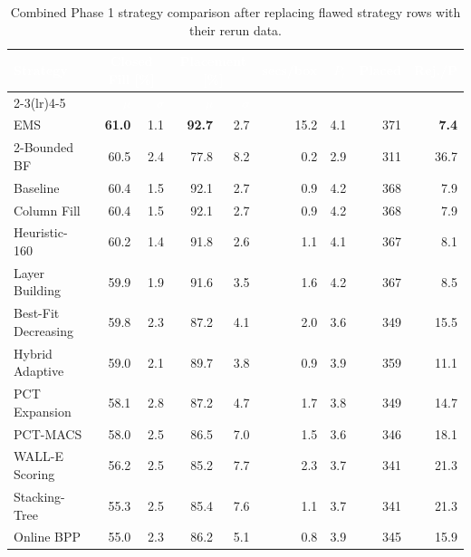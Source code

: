 \documentclass[border=8pt]{standalone}
\begin{document}
\begin{table}[htbp]
\centering
\caption{Combined Phase 1 strategy comparison after replacing flawed strategy rows with their rerun data.}
\label{tab:botko-overcoupled-phase1}
\small
\setlength{\tabcolsep}{4pt}
\renewcommand{\arraystretch}{1.15}
\begin{tabular}{lrrrrrrrr}
\toprule
\rowcolor{headerblue}
\textcolor{white}{\textbf{Strategy}} & \multicolumn{2}{c}{\textcolor{white}{\textbf{Closed Fill [\%]}}} & \multicolumn{2}{c}{\textcolor{white}{\textbf{Placement [\%]}}} & \textcolor{white}{\textbf{secs/box}} & \textcolor{white}{\textbf{$\overline{P_c}$}} & \textcolor{white}{\textbf{Placed}} & \textcolor{white}{\textbf{Rej./P}} \\
\cmidrule(lr){2-3}\cmidrule(lr){4-5}
\rowcolor{headerblue}
 & \textcolor{white}{$\mu$} & \textcolor{white}{$\sigma$} & \textcolor{white}{$\mu$} & \textcolor{white}{$\sigma$} & & & & \\
\midrule
EMS & \textcolor{bestgreen}{\textbf{61.0}} & 1.1 & \textcolor{bestgreen}{\textbf{92.7}} & 2.7 & 15.2 & 4.1 & 371 & \textcolor{bestgreen}{\textbf{7.4}} \\
\rowcolor{rowalt} 2-Bounded BF & 60.5 & 2.4 & 77.8 & 8.2 & 0.2 & 2.9 & 311 & 36.7 \\
Baseline & 60.4 & 1.5 & 92.1 & 2.7 & 0.9 & 4.2 & 368 & 7.9 \\
\rowcolor{rowalt} Column Fill & 60.4 & 1.5 & 92.1 & 2.7 & 0.9 & 4.2 & 368 & 7.9 \\
Heuristic-160 & 60.2 & 1.4 & 91.8 & 2.6 & 1.1 & 4.1 & 367 & 8.1 \\
\rowcolor{rowalt} Layer Building & 59.9 & 1.9 & 91.6 & 3.5 & 1.6 & 4.2 & 367 & 8.5 \\
Best-Fit Decreasing & 59.8 & 2.3 & 87.2 & 4.1 & 2.0 & 3.6 & 349 & 15.5 \\
\rowcolor{rowalt} Hybrid Adaptive & 59.0 & 2.1 & 89.7 & 3.8 & 0.9 & 3.9 & 359 & 11.1 \\
PCT Expansion & 58.1 & 2.8 & 87.2 & 4.7 & 1.7 & 3.8 & 349 & 14.7 \\
\rowcolor{rowalt} PCT-MACS & 58.0 & 2.5 & 86.5 & 7.0 & 1.5 & 3.6 & 346 & 18.1 \\
WALL-E Scoring & 56.2 & 2.5 & 85.2 & 7.7 & 2.3 & 3.7 & 341 & 21.3 \\
\rowcolor{rowalt} Stacking-Tree & 55.3 & 2.5 & 85.4 & 7.6 & 1.1 & 3.7 & 341 & 21.3 \\
Online BPP & 55.0 & 2.3 & 86.2 & 5.1 & 0.8 & 3.9 & 345 & 15.9 \\

\end{tabular}
\end{table}
\end{document}
